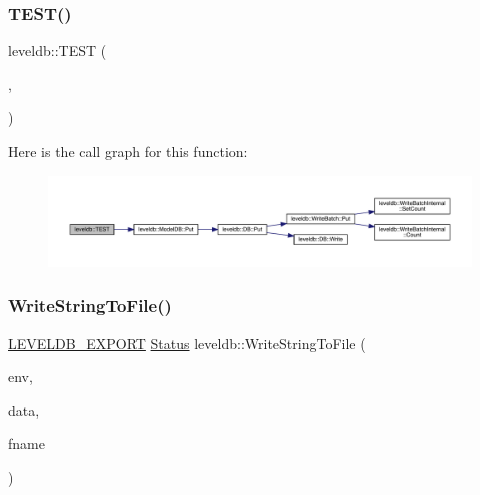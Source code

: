 \subsubsection{\texorpdfstring{TEST()}{TEST()}\hspace{0.1cm}{\footnotesize\ttfamily [102/102]}}
{\footnotesize\ttfamily leveldb\+::\+T\+E\+ST (\begin{DoxyParamCaption}\item[{\mbox{\hyperlink{classleveldb_1_1_d_b_test}{D\+B\+Test}}}]{,  }\item[{Randomized}]{ }\end{DoxyParamCaption})}

Here is the call graph for this function\+:
\nopagebreak
\begin{figure}[H]
\begin{center}
\leavevmode
\includegraphics[width=350pt]{namespaceleveldb_a028ed215c12e1998d7073b18fce4c24c_cgraph}
\end{center}
\end{figure}
\mbox{\label{namespaceleveldb_aa921f8824045bed5a75e2220a65bf68d}} 
\subsubsection{\texorpdfstring{WriteStringToFile()}{WriteStringToFile()}}
{\footnotesize\ttfamily \mbox{\hyperlink{export_8h_a658cd25b9dd114d894ae8ce9dddb7d3a}{L\+E\+V\+E\+L\+D\+B\+\_\+\+E\+X\+P\+O\+RT}} \mbox{\hyperlink{classleveldb_1_1_status}{Status}} leveldb\+::\+Write\+String\+To\+File (\begin{DoxyParamCaption}\item[{\mbox{\hyperlink{classleveldb_1_1_env}{Env}} $\ast$}]{env,  }\item[{const \mbox{\hyperlink{classleveldb_1_1_slice}{Slice}} \&}]{data,  }\item[{const std\+::string \&}]{fname }\end{DoxyParamCaption})}

